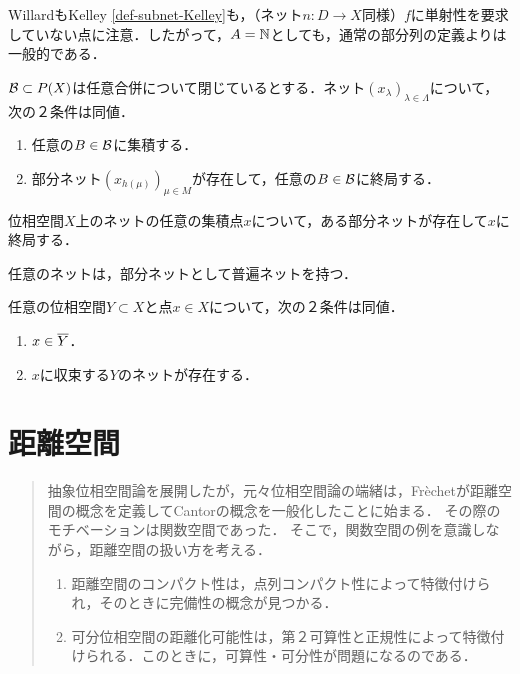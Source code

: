 \documentclass[uplatex,dvipdfmx]{jsreport}
\begin{document}
\begin{remark}
    WillardもKelley \ref{def-subnet-Kelley}も，（ネット$n:D\to X$同様）$f$に単射性を要求していない点に注意．したがって，$A=\mathbb{N}$としても，通常の部分列の定義よりは一般的である．
\end{remark}

\begin{lemma}[集積点の特徴付け]
    $\mathcal{B}\subset P(X)$は任意合併について閉じているとする．ネット$(x_\lambda)_{\lambda\in\Lambda}$について，次の２条件は同値．
    \begin{enumerate}
        \item 任意の$B\in\mathcal{B}$に集積する．
        \item 部分ネット$(x_{h(\mu)})_{\mu\in M}$が存在して，任意の$B\in\mathcal{B}$に終局する．
    \end{enumerate}
\end{lemma}

\begin{corollary}
    位相空間$X$上のネットの任意の集積点$x$について，ある部分ネットが存在して$x$に終局する．
\end{corollary}

\begin{theorem}
    任意のネットは，部分ネットとして普遍ネットを持つ．
\end{theorem}

\begin{proposition}[(AC)]
    任意の位相空間$Y\subset X$と点$x\in X$について，次の２条件は同値．
    \begin{enumerate}
        \item $x\in\overline{Y}$．
        \item $x$に収束する$Y$のネットが存在する．
    \end{enumerate}
\end{proposition}



\chapter{距離空間}

\begin{quotation}
    抽象位相空間論を展開したが，元々位相空間論の端緒は，Fr\`{e}chetが距離空間の概念を定義してCantorの概念を一般化したことに始まる．
    その際のモチベーションは関数空間であった．
    そこで，関数空間の例を意識しながら，距離空間の扱い方を考える．
    \begin{enumerate}
        \item 距離空間のコンパクト性は，点列コンパクト性によって特徴付けられ，そのときに完備性の概念が見つかる．
        \item 可分位相空間の距離化可能性は，第２可算性と正規性によって特徴付けられる．このときに，可算性・可分性が問題になるのである．
    \end{enumerate}
\end{quotation}
\end{document}

